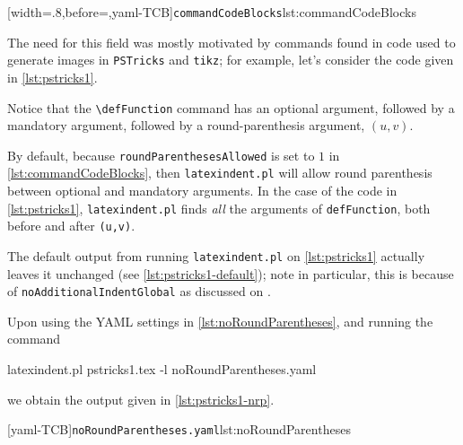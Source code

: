 \documentclass[10pt]{article}
\begin{document}
 [width=.8\linewidth,before=\centering,yaml-TCB]{\texttt{commandCodeBlocks}}{lst:commandCodeBlocks}


 \begin{example}
 The need for this field was mostly motivated by commands found in code used to generate
 images in \texttt{PSTricks} and \texttt{tikz}; for example, let's consider the code
 given in \cref{lst:pstricks1}.

 \begin{cmhtcbraster}
 \end{cmhtcbraster}

 Notice that the \lstinline!\defFunction! command has an optional argument, followed by a
 mandatory argument, followed by a round-parenthesis argument, $(u,v)$.

 By default, because \texttt{roundParenthesesAllowed} is set to $1$ in
 \cref{lst:commandCodeBlocks}, then \texttt{latexindent.pl} will allow round parenthesis
 between optional and mandatory arguments. In the case of the code in
 \cref{lst:pstricks1}, \texttt{latexindent.pl} finds \emph{all} the arguments of
 \lstinline!defFunction!, both before and after \lstinline!(u,v)!.

 The default output from running \texttt{latexindent.pl} on \cref{lst:pstricks1} actually
 leaves it unchanged (see \cref{lst:pstricks1-default}); note in particular, this is
 because of \texttt{noAdditionalIndentGlobal} as discussed on
 .

 Upon using the YAML settings in \cref{lst:noRoundParentheses}, and running the command

 \begin{commandshell}
latexindent.pl pstricks1.tex -l noRoundParentheses.yaml
\end{commandshell}

 we obtain the output given in \cref{lst:pstricks1-nrp}.

 \begin{cmhtcbraster}[raster column skip=.1\linewidth]
  [yaml-TCB]{\texttt{noRoundParentheses.yaml}}{lst:noRoundParentheses}
 \end{cmhtcbraster}


\end{example}
\end{document}

